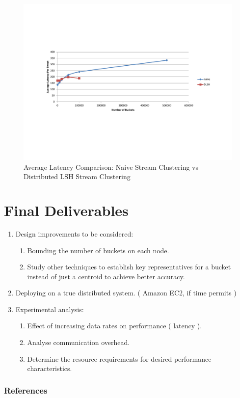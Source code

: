 \documentclass{article} %
\begin{document}
\begin{figure}[!ht]
\centering
\includegraphics[width=0.8\columnwidth]{perf.pdf}
\caption{Average Latency Comparison: Naive Stream Clustering vs Distributed LSH Stream Clustering}
\label{fig:result}
\end{figure}

\section{Final Deliverables}
\label{sec:future}
\begin{enumerate}
\item Design improvements to be considered:
\begin{enumerate}
\item Bounding the number of buckets on each node.
\item Study other techniques to establish key representatives for a bucket instead of just a centroid to achieve better accuracy.
\end{enumerate}
\item Deploying on a true distributed system. ( Amazon EC2, if time permits )
\item Experimental analysis:
\begin{enumerate}
\item Effect of increasing data rates on performance ( latency ).
\item Analyse communication overhead.
\item Determine the resource requirements for desired performance characteristics.
\end{enumerate}
\end{enumerate}



\subsubsection*{References}
\end{document}
